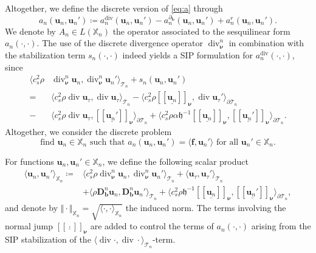 \documentclass{m2an}
\newcommand{\inner}[1]{\langle #1 \rangle}
\newcommand{\innerr}[1]{\langle \rho#1 \rangle}
\newcommand{\innercsr}[1]{\langle c_s^2 \rho#1 \rangle}
\newcommand{\nv}{\boldsymbol{\nu}}
\newcommand{\bflow}{\mathbf{b}}
\renewcommand{\u}{\mathbf{u}}
\renewcommand{\div}{\operatorname{div}}
\newcommand{\calT}{\mathcal{T}}
\newcommand{\X}{\mathbb{X}}
\newcommand{\Xn}{\mathbb{X}_n}
\newcommand{\bD}{\mathbf{D}}
\newcommand{\bff}{\mathbf{f}}
\newcommand{\hdgjump}[1]{[\![\underline{#1} ]\!]}
\newcommand{\Tn}{\calT_n}
\newcommand{\spl}{\langle}
\newcommand{\spr}{\rangle}
\newcommand{\diffb}{\partial_{\bflow}}
\newcommand{\ddiffb}{\bD_{\bflow}^n}
\newcommand{\ddiv}{\div_{\nv}^n}
\newcommand{\h}{\mathfrak{h}}
\newcommand{\adivn}{\hyperref[eq:an:components:adivn]{a^{\div}_n}}
\newcommand{\aconvn}{\hyperref[eq:an:components:aconvn]{a^{\diffb}_n}}
\newcommand{\aremn}{\hyperref[eq:an:components:aremn]{a^{r}_n}}
\theoremstyle{plain}
\theoremstyle{definition}
\begin{document}
Altogether, we define the discrete version of \eqref{eq:a} through
\begin{equation}\label{eq:an}
   a_n(\u_n,\u_n') \coloneqq \adivn(\u_n,\u_n') - \aconvn(\u_n,\u_n') + \aremn(\u_n,\u_n').
\end{equation}
We denote by $A_n \in L(\X_n)$ the operator associated to the sesquilinear form $a_n(\cdot,\cdot)$. The use of the discrete divergence operator $\ddiv$ in combination with the stabilization term $s_n(\cdot,\cdot)$ indeed yields a SIP formulation for $\adivn(\cdot,\cdot)$, since
\begin{align*}
   \innercsr{&\ddiv \u_n, \ddiv \u_n'}_{\Tn} \! + \! s_n(\u_n, \u_n') \\
   = &\innercsr{\div \u_{\tau}, \div \u_{\tau}}_{\Tn} - \innercsr{\hdgjump{\u_n}_{\nv}, \div \u_{\tau}'}_{\partial \Tn} \\
   -&\innercsr{\div \u_{\tau}, \hdgjump{\u_n'}_{\nv}}_{\partial \Tn} \! + \! \innercsr{\alpha \h^{-1} \hdgjump{\u_n}_{\nv}, \hdgjump{\u_n'}_{\nv}}_{\partial \Tn}.
\end{align*}
Altogether, we consider the discrete problem 
\begin{equation}\label{eq:discr:weakForm}
   \text{find } \u_n \in \X_n \text{ such that } a_n(\u_n,\u_n') = \spl \bff, \u_n' \spr \text{ for all } \u_n' \in \X_n.
\end{equation}

For functions $\u_n, \u_n' \in \Xn$, we define the following scalar product
\begin{equation}\label{def:scalarProductXn}
   \begin{aligned}
      \inner{\u_n, \u_n'}_{\Xn} \coloneqq &\innercsr{\ddiv \u_n, \ddiv \u_n'}_{\Tn} + \inner{\u_\tau, \u_\tau'}_{\Tn} \\
      &+ \innerr{\ddiffb \u_n, \ddiffb \u_n'}_{\Tn} + \innercsr{\h^{-1} \hdgjump{\u_n}_{\nv}, \hdgjump{\u_n'}_{\nv}}_{\partial \Tn},
   \end{aligned}
\end{equation}
and denote by $\Vert \cdot \Vert_{\Xn} = \sqrt{\spl \cdot, \cdot \spr_{\Xn}}$ the induced norm. The terms involving the normal jump $\hdgjump{\cdot}_{\nv}$ are added to control the terms of $a_n(\cdot,\cdot)$ arising from the SIP stabilization of the $\spl \div \cdot,\div \cdot \spr_{\Tn}$-term.
\end{document}
